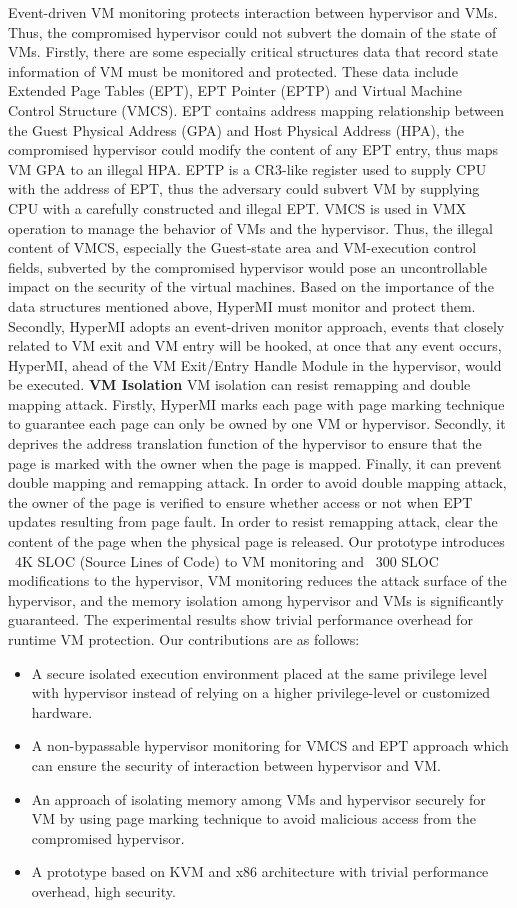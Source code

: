 \documentclass[conference]{IEEEtran}
\begin{document}
Event-driven VM monitoring protects interaction between hypervisor and VMs. Thus, the compromised hypervisor could not subvert the domain of the state of VMs. 
Firstly, there are some especially critical structures data that record state information of VM must be monitored and protected. These data include Extended Page Tables (EPT), EPT Pointer (EPTP) and Virtual Machine Control Structure (VMCS). EPT contains address mapping relationship between the Guest Physical Address (GPA) and Host Physical Address (HPA), the compromised hypervisor could modify the content of any EPT entry, thus maps VM GPA to an illegal HPA. EPTP is a CR3-like register used to supply CPU with the address of EPT, thus the adversary could subvert VM by supplying CPU with a carefully constructed and illegal EPT. VMCS is used in VMX operation to manage the behavior of VMs and the hypervisor. Thus, the illegal content of VMCS, especially the Guest-state area and VM-execution control fields, subverted by the compromised hypervisor would pose an uncontrollable impact on the security of the virtual machines. 
Based on the importance of the data structures mentioned above, HyperMI must monitor and protect them. 
Secondly, HyperMI adopts an event-driven monitor approach, events that closely related to VM exit and VM entry will be hooked, at once that any event occurs, HyperMI, ahead of the VM Exit/Entry Handle Module in the hypervisor, would be executed. 
\textbf{VM Isolation}
VM isolation can resist remapping and double mapping attack.
Firstly, HyperMI marks each page with page marking technique to guarantee each page can only be owned by one VM or hypervisor.
Secondly, it deprives the address translation function of the hypervisor to ensure that the page is marked with the owner when the page is mapped. 
Finally, it can prevent double mapping and remapping attack. In order to avoid double mapping attack, the owner of the page is verified to ensure whether access or not when EPT updates resulting from page fault. In order to resist remapping attack, clear the content of the page when the physical page is released.
Our prototype introduces ~4K SLOC (Source Lines of Code) to VM monitoring and ~300 SLOC modifications to the hypervisor, VM monitoring reduces the attack surface of the hypervisor, and the memory isolation among hypervisor and VMs is significantly guaranteed. The experimental results show trivial performance overhead for runtime VM protection. 
Our contributions are as follows:
\begin{itemize}
\item A secure isolated execution environment placed at the same privilege level with hypervisor instead of relying on a higher privilege-level or customized hardware.
\item{A non-bypassable hypervisor monitoring for VMCS and EPT approach which can ensure the security of interaction between hypervisor and VM.}
\item{An approach of isolating memory among VMs and hypervisor securely for VM by using page marking technique to avoid malicious access from the compromised hypervisor.}
\item{A prototype based on KVM and x86 architecture with trivial performance overhead, high security.}
\end{itemize}
\end{document}
